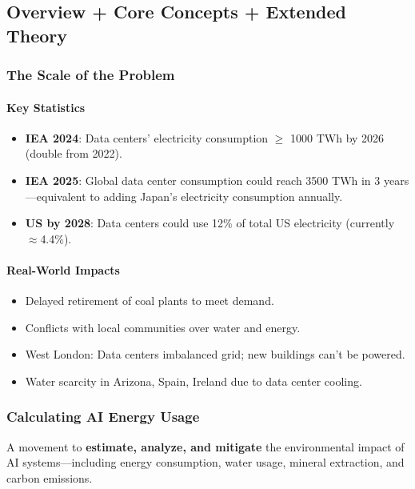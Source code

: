 \subsection{Overview + Core Concepts + Extended Theory}

\subsubsection*{The Scale of the Problem}

\paragraph*{Key Statistics}
\begin{itemize}
  \item \textbf{IEA 2024}: Data centers' electricity consumption $\geq$ 1000 TWh by 2026 (double from 2022).
  \item \textbf{IEA 2025}: Global data center consumption could reach 3500 TWh in 3 years---equivalent to adding Japan's electricity consumption annually.
  \item \textbf{US by 2028}: Data centers could use 12\% of total US electricity (currently $\approx$4.4\%).
\end{itemize}

\paragraph*{Real-World Impacts}
\begin{itemize}
  \item Delayed retirement of coal plants to meet demand.
  \item Conflicts with local communities over water and energy.
  \item West London: Data centers imbalanced grid; new buildings can't be powered.
  \item Water scarcity in Arizona, Spain, Ireland due to data center cooling.
\end{itemize}

\subsubsection*{Calculating AI Energy Usage}

\begin{defbox}[Green AI]
A movement to \textbf{estimate, analyze, and mitigate} the environmental impact of AI systems---including energy consumption, water usage, mineral extraction, and carbon emissions.
\end{defbox}

